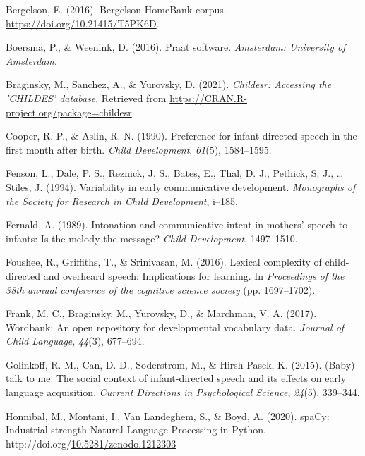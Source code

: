 \documentclass[10pt, letterpaper]{article}
\newenvironment{CSLReferences}%
  {}%
  {\par}
\begin{document}
\hypertarget{refs}{}
\begin{CSLReferences}{1}{0}
\leavevmode\hypertarget{ref-bergelsoncorpus}{}%
Bergelson, E. (2016). Bergelson HomeBank corpus.
\url{https://doi.org/10.21415/T5PK6D}.

\leavevmode\hypertarget{ref-boersma2016praat}{}%
Boersma, P., \& Weenink, D. (2016). Praat software. \emph{Amsterdam:
University of Amsterdam}.

\leavevmode\hypertarget{ref-braginsky2021childesr}{}%
Braginsky, M., Sanchez, A., \& Yurovsky, D. (2021). \emph{Childesr:
Accessing the 'CHILDES' database}. Retrieved from
\url{https://CRAN.R-project.org/package=childesr}

\leavevmode\hypertarget{ref-cooper1990preference}{}%
Cooper, R. P., \& Aslin, R. N. (1990). Preference for infant-directed
speech in the first month after birth. \emph{Child Development},
\emph{61}(5), 1584--1595.

\leavevmode\hypertarget{ref-fenson1994variability}{}%
Fenson, L., Dale, P. S., Reznick, J. S., Bates, E., Thal, D. J.,
Pethick, S. J., \ldots{} Stiles, J. (1994). Variability in early
communicative development. \emph{Monographs of the Society for Research
in Child Development}, i--185.

\leavevmode\hypertarget{ref-fernald1989intonation}{}%
Fernald, A. (1989). Intonation and communicative intent in mothers'
speech to infants: Is the melody the message? \emph{Child Development},
1497--1510.

\leavevmode\hypertarget{ref-foushee2016lexical}{}%
Foushee, R., Griffiths, T., \& Srinivasan, M. (2016). Lexical complexity
of child-directed and overheard speech: Implications for learning. In
\emph{Proceedings of the 38th annual conference of the cognitive science
society} (pp. 1697--1702).

\leavevmode\hypertarget{ref-frank2017wordbank}{}%
Frank, M. C., Braginsky, M., Yurovsky, D., \& Marchman, V. A. (2017).
Wordbank: An open repository for developmental vocabulary data.
\emph{Journal of Child Language}, \emph{44}(3), 677--694.

\leavevmode\hypertarget{ref-golinkoff2015baby}{}%
Golinkoff, R. M., Can, D. D., Soderstrom, M., \& Hirsh-Pasek, K. (2015).
(Baby) talk to me: The social context of infant-directed speech and its
effects on early language acquisition. \emph{Current Directions in
Psychological Science}, \emph{24}(5), 339--344.

\leavevmode\hypertarget{ref-honnibal2020spacy}{}%
Honnibal, M., Montani, I., Van Landeghem, S., \& Boyd, A. (2020).
{spaCy: Industrial-strength Natural Language Processing in Python}.
http://doi.org/\href{https://doi.org/10.5281/zenodo.1212303}{10.5281/zenodo.1212303}


\end{CSLReferences}
\end{document}
